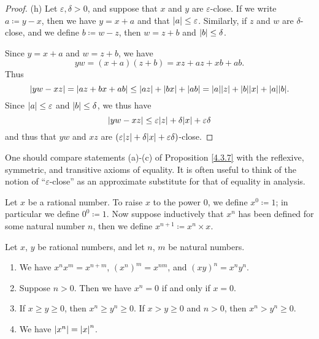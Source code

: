 \begin{proof}{(h)}
Let \(\varepsilon, \delta > 0\), and suppose that \(x\) and \(y\) are \(\varepsilon\)-close.
If we write \(a \coloneqq y - x\), then we have \(y = x + a\) and that \(\abs*{a} \leq \varepsilon\).
Similarly, if \(z\) and \(w\) are \(\delta\)-close, and we define \(b \coloneqq w - z\), then \(w = z + b\) and \(\abs*{b} \leq \delta\).

Since \(y = x + a\) and \(w = z + b\), we have
\[
    yw = (x + a)(z + b) = xz + az + xb + ab.
\]
Thus
\[
    \abs*{yw - xz} = \abs*{az + bx + ab} \leq \abs*{az} + \abs*{bx} + \abs*{ab} = \abs*{a}\abs*{z} + \abs*{b}\abs*{x} + \abs*{a}\abs*{b}.
\]
Since \(\abs*{a} \leq \varepsilon\) and \(\abs*{b} \leq \delta\), we thus have
\[
    \abs*{yw - xz} \leq \varepsilon\abs*{z} + \delta\abs*{x} + \varepsilon\delta
\]
and thus that \(yw\) and \(xz\) are \((\varepsilon\abs*{z} + \delta\abs*{x} + \varepsilon\delta)\)-close.
\end{proof}

\begin{remark}\label{4.3.8}
One should compare statements (a)-(c) of Proposition \ref{4.3.7} with the reflexive, symmetric, and transitive axioms of equality.
It is often useful to think of the notion of ``\(\varepsilon\)-close'' as an approximate substitute for that of equality in analysis.
\end{remark}

\begin{definition}\label{4.3.9}
Let \(x\) be a rational number.
To raise \(x\) to the power \(0\), we define \(x^0 \coloneqq 1\);
in particular we define \(0^0 \coloneqq 1\).
Now suppose inductively that \(x^n\) has been defined for some natural number \(n\), then we define \(x^{n+1} \coloneqq x^n \times x\).
\end{definition}

\begin{proposition}\label{4.3.10}
Let \(x\), \(y\) be rational numbers, and let \(n\), \(m\) be natural numbers.
\begin{enumerate}
    \item We have \(x^n x^m = x^{n + m}\), \((x^n)^m = x^{nm}\), and \((xy)^n = x^n y^n\).
    \item Suppose \(n > 0\).
    Then we have \(x^n = 0\) if and only if \(x = 0\).
    \item If \(x \geq y \geq 0\), then \(x^n \geq y^n \geq 0\).
    If \(x > y \geq 0\) and \(n > 0\), then \(x^n > y^n \geq 0\).
    \item We have \(\abs*{x^n} = \abs*{x}^n\).
\end{enumerate}
\end{proposition}

